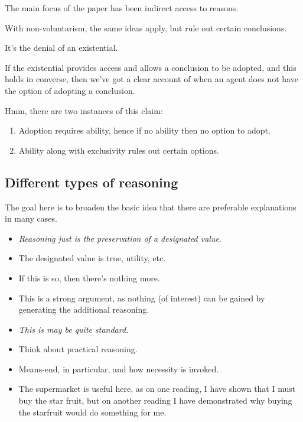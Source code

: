 \documentclass[10pt]{article}
\begin{document}
The main focus of the paper has been indirect access to reasons.

With non-voluntarism, the same ideas apply, but rule out certain conclusions.

It's the denial of an existential.

If the existential provides access and allows a conclusion to be adopted, and this holds in converse, then we've got a clear account of when an agent does not have the option of adopting a conclusion.

Hmm, there are two instances of this claim:
\begin{enumerate}
\item Adoption requires ability, hence if no ability then no option to adopt.
\item Ability along with exclusivity rules out certain options.
\end{enumerate}


\subsection{Different types of reasoning}
\label{sec:diff-types-reas}

\begin{note}[Idea]
  The goal here is to broaden the basic idea that there are preferable explanations in many cases.
\end{note}

\begin{itemize}
\item \emph{Reasoning just is the preservation of a designated value}.
\item The designated value is true, utility, etc.
\item If this is so, then there's nothing more.
\item This is a strong argument, as nothing (of interest) can be gained by generating the additional reasoning.
\end{itemize}

\begin{itemize}
\item \emph{This is may be quite standard.}
\item Think about practical reasoning.
\item Means-end, in particular, and how necessity is invoked.
\item The supermarket is useful here, as on one reading, I have shown that I must buy the star fruit, but on another reading I have demonstrated why buying the starfruit would do something for me.
\end{itemize}
\end{document}

